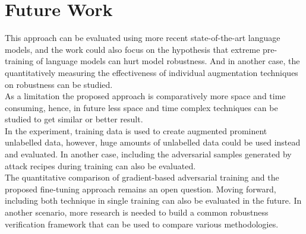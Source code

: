 \documentclass[%
	BCOR=8mm, %
	DIV=12,
	toc=bibliography, %
	toc=listof, %
	oneside, %
	egregdoesnotlikesansseriftitles, %
	]{scrbook}
\begin{document}
\section{Future Work }
\label{section:futurework}
This approach can be evaluated using more recent state-of-the-art language models, and the work could also focus on the hypothesis that extreme pre-training of language models can hurt model robustness. And in another case, the quantitatively measuring the effectiveness of individual augmentation techniques on robustness can be studied.\\
As a limitation the proposed approach is comparatively more space and time consuming, hence, in future less space and time complex techniques can be studied to get similar or better result. \\
In the experiment, training data is used to create augmented prominent unlabelled data, however,  huge amounts of unlabelled data could be used instead and evaluated. In another case, including the adversarial samples generated by attack recipes during training can also be evaluated. \\
The quantitative comparison of gradient-based adversarial training and the proposed fine-tuning approach remains an open question. Moving forward, including both technique in single training can also be evaluated in the future. In another scenario, more research is needed to build a common robustness verification framework that can be used to compare various methodologies.






%
%
\printbibliography
\end{document}
